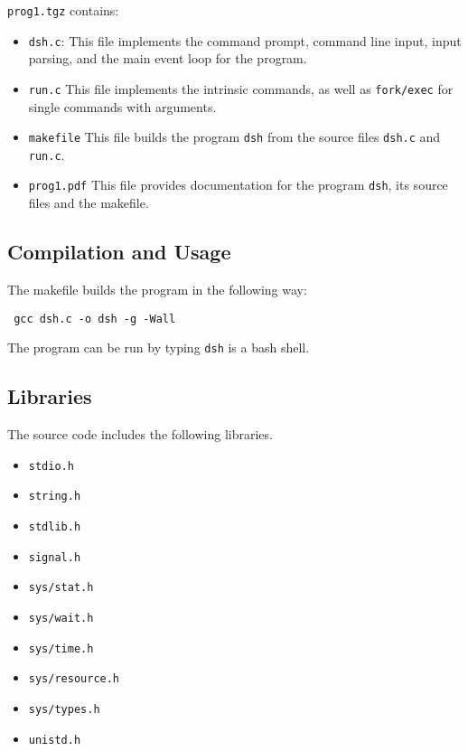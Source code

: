 \documentclass[11pt,a4paper]{article}
\begin{document}
\texttt{prog1.tgz} contains: 
\begin{itemize}

\item \texttt{dsh.c}: This file implements the command prompt, command line input, input parsing, and the main event loop for the program.

\item \texttt{run.c} This file implements the intrinsic commands, as well as \texttt{fork/exec} for single commands with arguments.

\item \texttt{makefile} This file builds the program \texttt{dsh} from the source files \texttt{dsh.c} and \texttt{run.c}.

\item \texttt{prog1.pdf} This file provides documentation for the program \texttt{dsh}, its source files and the makefile.

\end{itemize}

\subsection*{Compilation and Usage}

The makefile builds the program in the following way:

\begin{description}
\item \texttt{ gcc dsh.c -o dsh -g -Wall }
\end{description}

The program can be run by typing \texttt{dsh} is a bash shell.

\subsection*{Libraries}

The source code includes the following libraries.

\begin{itemize}
\item \texttt{stdio.h}
\item \texttt{string.h}
\item \texttt{stdlib.h}
\item \texttt{signal.h}
\item \texttt{sys/stat.h}
\item \texttt{sys/wait.h}
\item \texttt{sys/time.h}
\item \texttt{sys/resource.h}
\item \texttt{sys/types.h}
\item \texttt{unistd.h}
\end{itemize}
\end{document}
